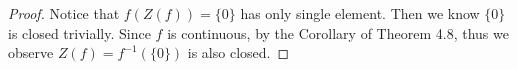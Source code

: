 \begin{Exercise}
	\begin{proof}
		Notice that $f(Z(f)) = \{0\}$ has only single element. 
		Then we know $\{0\}$ is closed trivially. 
		Since $f$ is continuous, by the Corollary of Theorem 4.8, thus we observe $Z(f) = f^{-1}(\{0\})$ is also closed.
	\end{proof}
\end{Exercise}